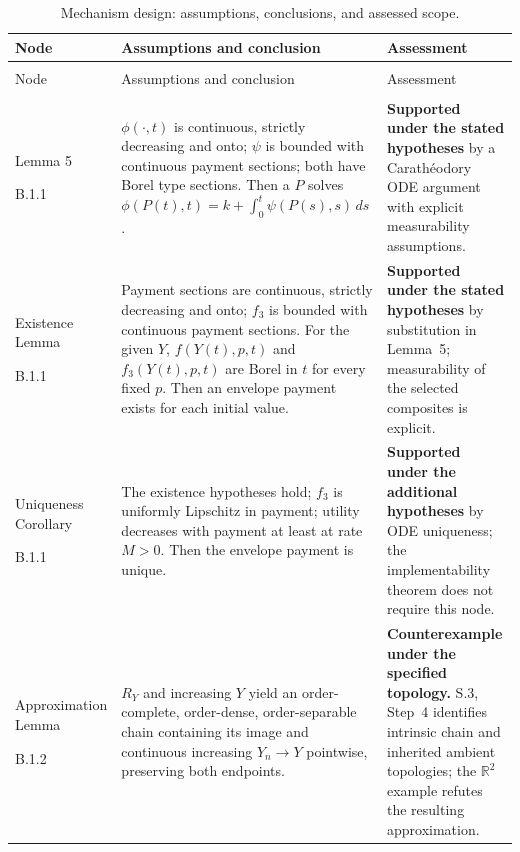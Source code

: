\documentclass[11pt]{article}
\theoremstyle{remark}\newtheorem{remark}[theorem]{Remark}
\begin{document}
\begingroup
\small
\setlength{\tabcolsep}{3pt}
\renewcommand{\arraystretch}{1.14}
\begin{longtable}{@{}>{\raggedright\arraybackslash}p{2.60cm}>{\raggedright\arraybackslash}p{6.30cm}>{\raggedright\arraybackslash}p{6.45cm}@{}}
\caption{Mechanism design: assumptions, conclusions, and assessed scope.}
\label{tab:dependency-mechanism-full}\\
\toprule
Node & Assumptions and conclusion & Assessment \\
\midrule
\endfirsthead
\multicolumn{3}{@{}l}{\textit{Table \thetable\ continued}}\\
\toprule
Node & Assumptions and conclusion & Assessment \\
\midrule
\endhead
\midrule
\multicolumn{3}{r@{}}{\textit{Continued on next page}}\\
\endfoot
\bottomrule
\endlastfoot
Lemma 5\par B.1.1
& $\phi(\cdot,t)$ is continuous, strictly decreasing and onto; $\psi$ is bounded with continuous payment sections; both have Borel type sections. Then a $P$ solves
$\phi(P(t),t)=k+\int_0^t\psi(P(s),s)\,ds$.
& \textbf{Supported under the stated hypotheses} by a Carath\'eodory ODE argument with explicit measurability assumptions. \\
Existence Lemma\par B.1.1
& Payment sections are continuous, strictly decreasing and onto; $f_3$ is bounded with continuous payment sections. For the given $Y$, $f(Y(t),p,t)$ and $f_3(Y(t),p,t)$ are Borel in $t$ for every fixed $p$. Then an envelope payment exists for each initial value.
& \textbf{Supported under the stated hypotheses} by substitution in Lemma~5; measurability of the selected composites is explicit. \\
Uniqueness Corollary\par B.1.1
& The existence hypotheses hold; $f_3$ is uniformly Lipschitz in payment; utility decreases with payment at least at rate $M>0$. Then the envelope payment is unique.
& \textbf{Supported under the additional hypotheses} by ODE uniqueness; the implementability theorem does not require this node. \\
Approximation Lemma\par B.1.2
& $R_Y$ and increasing $Y$ yield an order-complete, order-dense, order-separable chain containing its image and continuous increasing $Y_n\to Y$ pointwise, preserving both endpoints.
& \textbf{Counterexample under the specified topology.} S.3, Step~4 identifies intrinsic chain and inherited ambient topologies; the $\mathbb R^2$ example refutes the resulting approximation. \\

\end{longtable}
\end{document}

